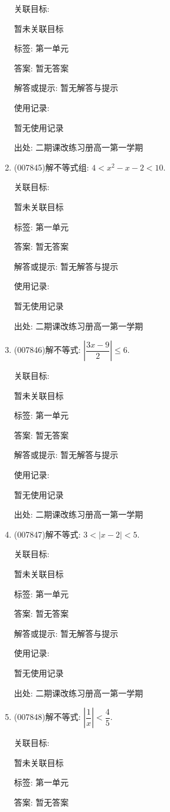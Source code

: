 \documentclass[10pt,a4paper]{article}
\begin{document}
\begin{enumerate}[1.]
关联目标:

暂未关联目标



标签: 第一单元

答案: 暂无答案

解答或提示: 暂无解答与提示

使用记录:

暂无使用记录


出处: 二期课改练习册高一第一学期
\item { (007845)}解不等式组: $4<x^2-x-2<10$.


关联目标:

暂未关联目标



标签: 第一单元

答案: 暂无答案

解答或提示: 暂无解答与提示

使用记录:

暂无使用记录


出处: 二期课改练习册高一第一学期
\item { (007846)}解不等式: $|\dfrac{3x-9}2|\le 6$.


关联目标:

暂未关联目标



标签: 第一单元

答案: 暂无答案

解答或提示: 暂无解答与提示

使用记录:

暂无使用记录


出处: 二期课改练习册高一第一学期
\item { (007847)}解不等式: $3<|x-2|<5$.


关联目标:

暂未关联目标



标签: 第一单元

答案: 暂无答案

解答或提示: 暂无解答与提示

使用记录:

暂无使用记录


出处: 二期课改练习册高一第一学期
\item { (007848)}解不等式: $|\dfrac 1x|<\dfrac 45$.


关联目标:

暂未关联目标



标签: 第一单元

答案: 暂无答案


\end{enumerate}
\end{document}
